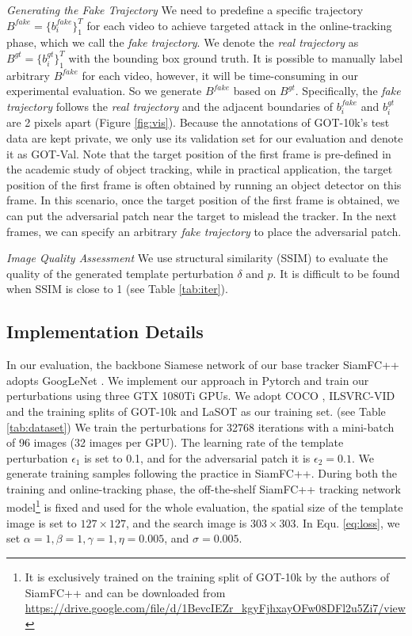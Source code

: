 \documentclass[journal]{IEEEtran}
\begin{document}
\textit{Generating the Fake Trajectory} We need to predefine a specific trajectory $B^{fake}=\{b^{fake}_i\}_1^{T}$ for each video to achieve targeted attack in the online-tracking phase, which we call the \textit{fake trajectory}. We denote the \textit{real trajectory} as $B^{gt}=\{b^{gt}_i\}_1^T$ with the bounding box ground truth.
It is possible to manually label arbitrary $B^{fake}$ for each video, however, it will be time-consuming in our experimental evaluation. So we generate $B^{fake}$ based on $B^{gt}$. Specifically, the \textit{fake trajectory} follows the \textit{real trajectory} and the adjacent boundaries of $b^{fake}_i$ and $b^{gt}_i$ are 2 pixels apart (Figure \ref{fig:vis}).
Because the annotations of GOT-10k's test data are kept private, we only use its validation set for our evaluation and denote it as GOT-Val. Note that the target position of the first frame is pre-defined in the academic study of object tracking, while in practical application, the target position of the first frame is often obtained by running an object detector on this frame. In this scenario, once the target position of the first frame is obtained, we can put the adversarial patch near the target to mislead the tracker. In the next frames, we can specify an arbitrary \textit{fake trajectory} to place the adversarial patch.

\textit{Image Quality Assessment} We use structural similarity (SSIM) \cite{SSIM} to evaluate the quality of the generated template perturbation $\delta$ and $p$. It is difficult to be found when SSIM is close to 1 (see Table \ref{tab:iter}).

\subsection{Implementation Details}

In our evaluation, the backbone Siamese network of our base tracker SiamFC++ \cite{SiamFC++} adopts GoogLeNet \cite{GoogLeNet}.
We implement our approach in Pytorch and train our perturbations using three GTX 1080Ti GPUs.
We adopt COCO \cite{COCO}, ILSVRC-VID \cite{VID} and the training splits of GOT-10k \cite{GOT-10k} and LaSOT \cite{LaSOT} as our training set. (see Table \ref{tab:dataset})
We train the perturbations for 32768 iterations with a mini-batch of 96 images (32 images per GPU).
The learning rate of the template perturbation $\epsilon_1$ is set to 0.1, and for the adversarial patch it is $\epsilon_2 = 0.1$.
We generate training samples following the practice in SiamFC++.
During both the training and online-tracking phase, the off-the-shelf SiamFC++ tracking network model\footnote{It is exclusively trained on the training split of GOT-10k by the authors of SiamFC++ and can be downloaded from \url{https://drive.google.com/file/d/1BevcIEZr_kgyFjhxayOFw08DFl2u5Zi7/view}} is fixed and used for the whole evaluation, the spatial size of the template image is set to $127\times 127$, and the search image is $303\times 303$.
In Equ. \ref{eq:loss}, we set $\alpha=1, \beta=1, \gamma=1, \eta=0.005$, and $\sigma=0.005$.
\end{document}

